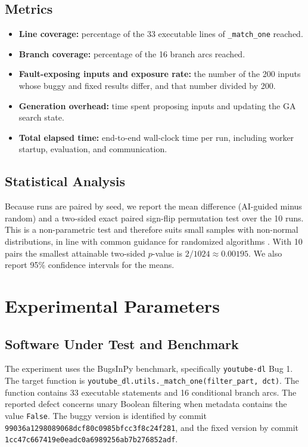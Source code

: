 \documentclass[12pt,onecolumn]{IEEEtran}
\begin{document}
\subsection{Metrics}

\begin{itemize}
    \item \textbf{Line coverage:} percentage of the 33 executable lines of \texttt{\_match\_one} reached.
    \item \textbf{Branch coverage:} percentage of the 16 branch arcs reached.
    \item \textbf{Fault-exposing inputs and exposure rate:} the number of the 200 inputs whose buggy and fixed results differ, and that number divided by 200.
    \item \textbf{Generation overhead:} time spent proposing inputs and updating the GA search state.
    \item \textbf{Total elapsed time:} end-to-end wall-clock time per run, including worker startup, evaluation, and communication.
\end{itemize}

\subsection{Statistical Analysis}

Because runs are paired by seed, we report the mean difference (AI-guided minus random) and a two-sided exact paired sign-flip permutation test over the 10 runs. This is a non-parametric test and therefore suits small samples with non-normal distributions, in line with common guidance for randomized algorithms \cite{arcuri2014}. With 10 pairs the smallest attainable two-sided $p$-value is $2/1024\approx 0.00195$. We also report 95\% confidence intervals for the means.

\section{Experimental Parameters}

\subsection{Software Under Test and Benchmark}

The experiment uses the BugsInPy benchmark, specifically \texttt{youtube-dl} Bug 1. The target function is \texttt{youtube\_dl.utils.\_match\_one(filter\_part, dct)}. The function contains 33 executable statements and 16 conditional branch arcs. The reported defect concerns unary Boolean filtering when metadata contains the value \texttt{False}. The buggy version is identified by commit \texttt{99036a1298089068dcf80c0985bfcc3f8c24f281}, and the fixed version by commit \texttt{1cc47c667419e0eadc0a6989256ab7b276852adf}.
\end{document}
